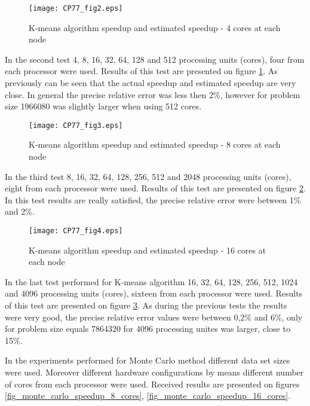 \documentclass[runningheads]{llncs}
\begin{document}
\begin{figure}[bht!]
  \centering
  \texttt{[image: CP77\_fig2.eps]}
  \caption{K-means algorithm speedup and estimated speedup - 4 cores at each node}
  \label{fig_k-means_speedup_4_cores}
\end{figure}

In the second test 4, 8, 16, 32, 64, 128 and 512 processing units (cores), four from each processor were used. Results of this test are presented on figure \ref{fig_k-means_speedup_4_cores}. As previously can be seen that the actual speedup and estimated speedup are very close. In general the precise relative error was less then 2\%, however for problem size 1966080 was slightly larger when using 512 cores.  

\begin{figure}[bht!]
  \centering
  \texttt{[image: CP77\_fig3.eps]}
  \caption{K-means algorithm speedup and estimated speedup - 8 cores at each node}
  \label{fig_k-means_speedup_8_cores}
\end{figure}

In the third test 8, 16, 32, 64, 128, 256, 512 and 2048 processing units (cores), eight from each processor were used. Results of this test are presented on figure \ref{fig_k-means_speedup_8_cores}. In this test results are really satisfied, the precise relative error were between 1\% and 2\%.  

\begin{figure}[bht!]
  \centering
  \texttt{[image: CP77\_fig4.eps]}
  \caption{K-means algorithm speedup and estimated speedup - 16 cores at each node}
  \label{fig_k-means_speedup_16_cores}
\end{figure}

In the last test performed for K-means algorithm 16, 32, 64, 128, 256, 512, 1024 and 4096 processing units (cores), sixteen from each processor were used. Results of this test are presented on figure \ref{fig_k-means_speedup_16_cores}. As during the previous tests the results were very good, the precise relative error values were between 0,2\% and 6\%, only for problem size equals 7864320 for 4096 processing unites was larger, close to 15\%.

In the experiments performed for Monte Carlo method different data set sizes were used. Moreover different hardware configurations by means different number of cores from each processor were used. Received results are presented on figures  \ref{fig_monte_carlo_speedup_8_cores}, \ref{fig_monte_carlo_speedup_16_cores}.
\end{document}
